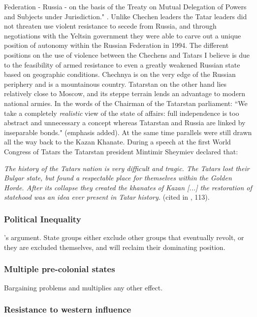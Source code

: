 \documentclass[12pt]{article}
\begin{document}
Federation - Russia - on the basis of the Treaty on Mutual Delegation of Powers
and Subjects under Jurisdiction." \citet{Sharifzhanov_2007}. Unlike Chechen
leaders the Tatar leaders did not threaten use violent resistance to secede from
Russia, and through negotiations with the Yeltsin government they were able to
carve out a unique position of autonomy within the Russian Federation in 1994.
The different positions on the use of violence between the Chechens and Tatars
I believe is due to the feasibility of armed resistance to even a greatly
weakened Russian state based on geographic conditions. Chechnya is on the very
edge of the Russian periphery and is a mountainous country. Tatarstan on the
other hand lies relatively close to Moscow, and its steppe terrain lends an
advantage to modern national armies. In the words of the Chairman of the
Tatarstan parliament: ``We take a completely \textit{realistic} view of the
state of affairs: full independence is too abstract and unnecessary a concept
whereas Tatarstan and Russia are linked by inseparable bonds."
\citep{Sharifzhanov_2007}(emphasis added). At the same time parallels were still
drawn all the way back to the Kazan Khanate. During a speech at the first World
Congress of Tatars the Tatarstan president Mintimir Sheymiev declared that:

\textit{The history of the Tatars nation is very difficult and tragic. The
Tatars lost their Bulgar state, but found a respectable place for themselves
within the Golden Horde. After its collapse they created the khanates of Kazan
[...] the restoration of statehood was an idea ever present in Tatar history.}
(cited in \citet{mustafin1995pervyi}, 113).

\subsubsection{Political Inequality}

\citet{Paine2019}'s argument. State groups either exclude other groups that
eventually revolt, or they are excluded themselves, and will reclaim their
dominating position.

\subsubsection{Multiple pre-colonial states}

Bargaining problems and multiplies any other effect.

\subsubsection{Resistance to western influence}
\end{document}
